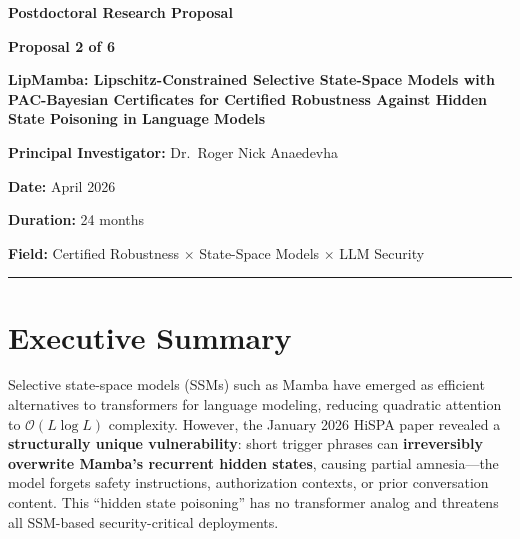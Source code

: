 \documentclass[12pt,a4paper]{article}
\newcommand{\calO}{\mathcal{O}}
\begin{document}
\begin{center}
{\LARGE \textbf{Postdoctoral Research Proposal}}

\vspace{0.5cm}

{\Large \textbf{Proposal 2 of 6}}

\vspace{1cm}

{\huge \textbf{LipMamba: Lipschitz-Constrained Selective State-Space Models with PAC-Bayesian Certificates for Certified Robustness Against Hidden State Poisoning in Language Models}}

\vspace{1cm}

{\large \textbf{Principal Investigator:} Dr.\ Roger Nick Anaedevha}

\vspace{0.3cm}

{\large \textbf{Date:} April 2026}

\vspace{0.3cm}

{\large \textbf{Duration:} 24 months}

\vspace{0.3cm}

{\large \textbf{Field:} Certified Robustness $\times$ State-Space Models $\times$ LLM Security}

\end{center}

\vspace{1cm}
\hrule
\vspace{0.5cm}

\tableofcontents

\newpage

\section{Executive Summary}

Selective state-space models (SSMs) such as Mamba have emerged as efficient alternatives to transformers for language modeling, reducing quadratic attention to $\calO(L \log L)$ complexity. However, the January 2026 HiSPA paper revealed a \textbf{structurally unique vulnerability}: short trigger phrases can \textbf{irreversibly overwrite Mamba's recurrent hidden states}, causing partial amnesia---the model forgets safety instructions, authorization contexts, or prior conversation content. This ``hidden state poisoning'' has no transformer analog and threatens all SSM-based security-critical deployments.
\end{document}
